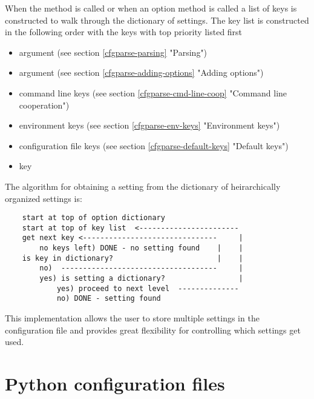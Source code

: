 \documentclass{howto}
\begin{document}
When the  method is called or when an option  method
is called a list of keys is constructed to walk through the dictionary
of settings.  The key list is constructed in the following order with the
keys with top priority listed first

\begin{itemize}
\item {}  argument 
      (see section \ref{cfgparse-parsing} "Parsing")
\item {}  argument
      (see section \ref{cfgparse-adding-options} "Adding options")
\item command line keys
      (see section \ref{cfgparse-cmd-line-coop} "Command line cooperation")
\item environment keys
      (see section \ref{cfgparse-env-keys} "Environment keys")
\item configuration file keys
      (see section \ref{cfgparse-default-keys} "Default keys")
\item {} key
\end{itemize}

The algorithm for obtaining a setting from the dictionary of heirarchically 
organized settings is:

\begin{verbatim}
    start at top of option dictionary
    start at top of key list  <-----------------------
    get next key <-------------------------------     |                               
        no keys left) DONE - no setting found    |    |
    is key in dictionary?                        |    |
        no)  ------------------------------------     |
        yes) is setting a dictionary?                 |
            yes) proceed to next level  --------------
            no) DONE - setting found
\end{verbatim}

This implementation allows the user to store multiple settings 
in the configuration file and provides great flexibility for 
controlling which settings get used.

\section{Python configuration files\label{cfgparse-python}}
\end{document}
